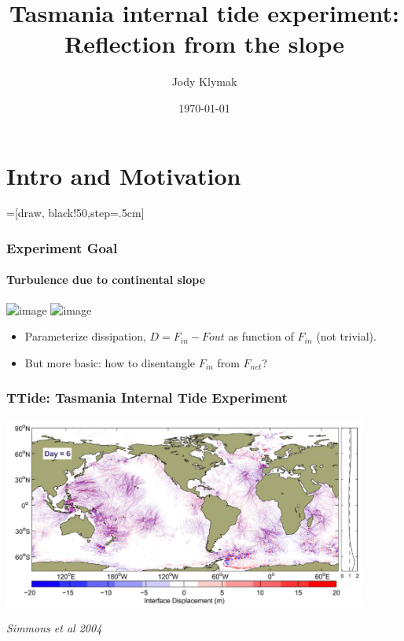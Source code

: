 \documentclass[]{beamer}
\title[TTide SIO 2015]{Tasmania internal tide experiment: Reflection from the slope}
\subtitle{}
\author{Jody Klymak}
\institute[UVic]{University of Victoria}
\date{\today}
\begin{document}
\frame{\titlepage}

\section{Intro and Motivation}
\def\tikzoverlay{%
   \tikz[baseline,overlay]\node[every overlay node]
}%


=[draw, black!50,step=.5cm]

\begin{frame}
  \frametitle{Experiment Goal}
  \framesubtitle{Turbulence due to continental slope}
  \includegraphics<1>[width=0.9\textwidth,trim=0 0 0 0, clip]{../writeups/Time11Annote.png}
  \includegraphics<2>[width=0.9\textwidth,trim=0 0 0 0, clip]{../writeups/Time11Annote2.png}
  
  \begin{itemize}
    \item<1->Parameterize dissipation, $D=F_{in}-F{out}$ as function of $F_{in}$ (not trivial).
    \item<2->But more basic: how to disentangle $F_{in}$ from $F_{net}$?  
  \end{itemize}
\end{frame}

\begin{frame}
  \frametitle{TTide: Tasmania Internal Tide Experiment}
  \includegraphics[width=0.9\textwidth]{doc/SimmonsEtAl04a.png}
  
  \emph{Simmons et al 2004}
\end{frame}
\end{document}
